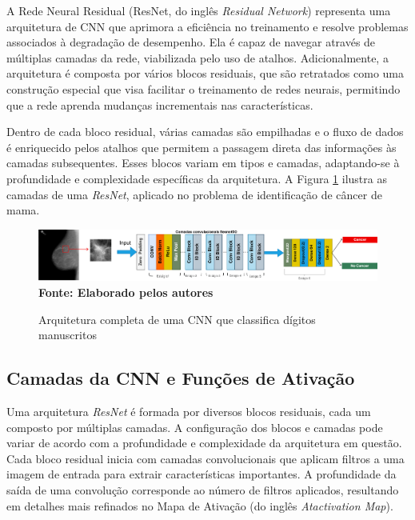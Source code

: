 
A Rede Neural Residual (ResNet, do inglês \textit{Residual Network}) representa uma arquitetura de CNN que aprimora a eficiência no treinamento e resolve problemas associados à degradação de desempenho. Ela é capaz de navegar através de múltiplas camadas da rede, viabilizada pelo uso de atalhos. Adicionalmente, a arquitetura é composta por vários blocos residuais, que são retratados como uma construção especial que visa facilitar o treinamento de redes neurais, permitindo que a rede aprenda mudanças incrementais nas características.

Dentro de cada bloco residual, várias camadas são empilhadas e o fluxo de dados é enriquecido pelos atalhos que permitem a passagem direta das informações às camadas subsequentes. Esses blocos variam em tipos e camadas, adaptando-se à profundidade e complexidade específicas da arquitetura. A Figura \ref{fig:cnn} ilustra as camadas de uma \textit{ResNet}, aplicado no problema de identificação de câncer de mama.

\begin{figure}[ht]
 	\centering	
 	\caption[\hspace{0.1cm}Grade Computacional.]{Arquitetura completa de uma CNN que classifica dígitos manuscritos}
 	\vspace{-0.2cm}
 	\includegraphics[width=1\textwidth]{figuras/cnn.png}
 	\captionsetup{justification=centering}
	\vspace{-0.2cm}
     \\\textbf{\footnotesize Fonte: Elaborado pelos autores}
	\label{fig:cnn}
\end{figure}

\subsection{\esp Camadas da CNN e Funções de Ativação} \label{camadasfund}

Uma arquitetura \textit{ResNet} é formada por diversos blocos residuais, cada um composto por múltiplas camadas. A configuração dos blocos e camadas pode variar de acordo com a profundidade e complexidade da arquitetura em questão. Cada bloco residual inicia com camadas convolucionais que aplicam filtros a uma imagem de entrada para extrair características importantes. A profundidade da saída de uma convolução corresponde ao número de filtros aplicados, resultando em detalhes mais refinados no Mapa de Ativação (do inglês \textit{Atactivation Map}).

